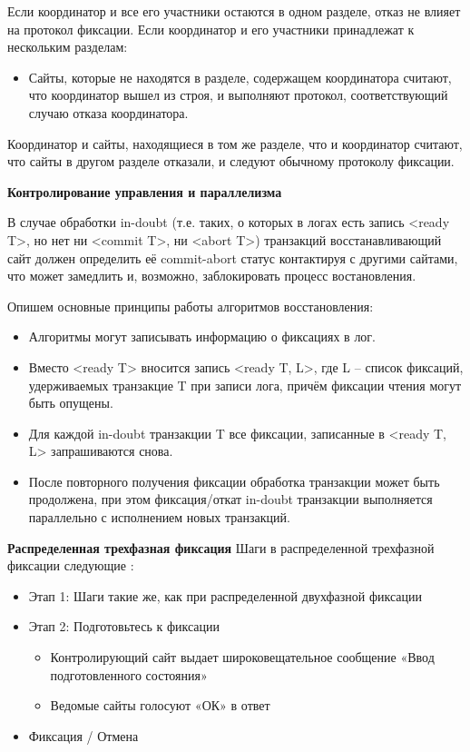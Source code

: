 \begin{itemize}
Если координатор и все его участники остаются в одном разделе, отказ не влияет на протокол фиксации.\autocite{Fixations}
Если координатор и его участники принадлежат к нескольким разделам:
\begin{itemize}
\item Сайты, которые не находятся в разделе, содержащем координатора считают, что координатор вышел из строя, и выполняют протокол, соответствующий случаю отказа координатора.

\end{itemize}
Координатор и сайты, находящиеся в том же разделе, что и координатор считают, что сайты в другом разделе отказали, и следуют обычному протоколу фиксации.


\end{itemize}

\bigbreak
\textbf{Контролирование управления и параллелизма}

В случае обработки in-doubt (т.е. таких, о которых в логах есть запись <ready T>, но нет ни <commit T>, ни <abort T>) транзакций восстанавливающий сайт должен определить её commit-abort статус контактируя с другими сайтами, что может замедлить и, возможно, заблокировать процесс востановления\autocite{Fixations}.

Опишем основные принципы работы алгоритмов восстановления:
\begin{itemize}
    \item Алгоритмы могут записывать информацию о фиксациях в лог.
    \item Вместо <ready T> вносится запись <ready T, L>, где L -- список фиксаций, удерживаемых транзакцие T при записи лога, причём фиксации чтения могут быть опущены.
    \item Для каждой in-doubt транзакции T все фиксации, записанные в <ready T, L> запрашиваются снова.
    \item После повторного получения фиксации обработка транзакции может быть продолжена, при этом фиксация/откат in-doubt транзакции выполняется параллельно с исполнением новых транзакций.
\end{itemize}

\bigbreak
\textbf{Распределенная трехфазная фиксация}
Шаги в распределенной трехфазной фиксации следующие \autocite{FixProtocols}:
\begin{itemize}
    \item Этап 1: Шаги такие же, как при распределенной двухфазной фиксации
    \item Этап 2: Подготовьтесь к фиксации
    \begin{itemize}
        \item Контролирующий сайт выдает широковещательное сообщение «Ввод подготовленного состояния»
        \item Ведомые сайты голосуют «ОК» в ответ
    \end{itemize}
    \item Фиксация / Отмена
\end{itemize}

